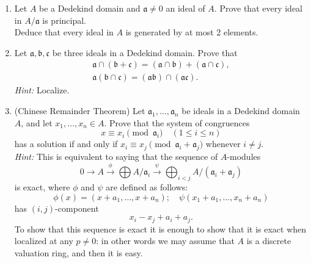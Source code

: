 \begin{enumerate}
    \item \label{exer7-chapter9}Let $A$ be a Dedekind domain and $\mathfrak{a} \neq 0$ an ideal of $A$. Prove that every ideal in $A/\mathfrak{a}$ is principal.\\
    Deduce that every ideal in $A$ is generated by at most 2 elements.

    \item \label{exer8-chapter9}Let $\mathfrak{a}, \mathfrak{b}, \mathfrak{c}$ be three ideals in a Dedekind domain. Prove that
    \[\begin{aligned}
        \mathfrak{a} \cap (\mathfrak{b} + \mathfrak{c}) = (\mathfrak{a} \cap \mathfrak{b}) + (\mathfrak{a} \cap \mathfrak{c}),\\
        \mathfrak{a}(\mathfrak{b} \cap \mathfrak{c}) = (\mathfrak{a}\mathfrak{b}) \cap (\mathfrak{a}\mathfrak{c}).
    \end{aligned}
    \]
    \textit{Hint:} Localize.

    \item \label{exer9-chapter9}(Chinese Remainder Theorem) Let $\mathfrak{a}_1, \ldots, \mathfrak{a}_n$ be ideals in a Dedekind domain $A$, and let $x_1, \ldots, x_n \in A$. Prove that the system of congruences
    \[
    x \equiv x_i \pmod{\mathfrak{a}_i} \quad (1 \leq i \leq n)
    \]
    has a solution if and only if $x_i \equiv x_j \pmod{\mathfrak{a}_i + \mathfrak{a}_j}$ whenever $i \neq j$.\\
    \textit{Hint:} This is equivalent to saying that the sequence of $A$-modules
    \[
    0 \longrightarrow A \stackrel{\phi}{\longrightarrow} \bigoplus A/\mathfrak{a}_i \stackrel{\psi}{\longrightarrow} \bigoplus_{i < j} A/(\mathfrak{a}_i + \mathfrak{a}_j)
    \]
    is exact, where $\phi$ and $\psi$ are defined as follows:  
    \[ \phi(x) = (x + a_1, \ldots, x + a_n); \quad \psi(x_1 + a_1, \ldots, x_n + a_n) \] has $(i, j)$-component  
    \[ x_i - x_j + a_i + a_j. \] To show that this sequence is exact it is enough to show that  
    it is exact when localized at any $p \neq 0$: in other words we may assume that $A$ is a discrete valuation ring, and then it is easy.
\end{enumerate}
